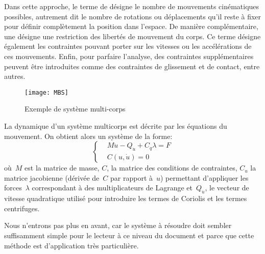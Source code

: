 \medskip
Dans cette approche, le terme de  désigne le nombre de mouvements cinématiques possibles, autrement dit le nombre de rotations ou déplacements qu'il reste à fixer pour définir complètement la position dans l'espace. De manière complémentaire, une  désigne une restriction des libertés de mouvement du corps. Ce terme désigne également les contraintes pouvant porter sur les vitesses ou les accélérations de ces mouvements. Enfin, pour parfaire l'analyse, des contraintes supplémentaires peuvent être introduites comme des contraintes de glissement et de contact, entre autres.
\begin{figure}[ht]
\centering
\texttt{[image: MBS]}
\caption{Exemple de système multi-corps}
\end{figure}
\medskipvm
La dynamique d'un système multicorps est décrite par les équations du mouvement. On obtient alors un système de la forme:
\begin{equation}%
\left\{%
\begin{aligned}%
&M\ddot{u}-Q_{\dot{u}}+C_q\lambda = F\\
&C(u,\dot{u})=0
\end{aligned}\right.%
\end{equation}%
où~$M$ est la matrice de masse, $C$, la matrice des conditions de contraintes, $C_u$ la matrice jacobienne (dérivée de~$C$ par rapport à~$u$) permettant d'appliquer les forces~$\lambda$ correspondant à des multiplicateurs de Lagrange et~$Q_{\dot{u}}$, le vecteur de vitesse quadratique utilisé pour introduire les termes de Coriolis et les termes centrifuges.

\medskip
Nous n'entrons pas plus en avant, car le système à résoudre doit sembler suffisamment simple pour le lecteur à ce niveau du document et parce que cette méthode est d'application très particulière.
